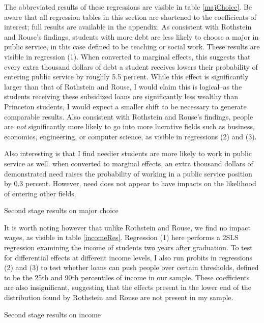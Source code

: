 \documentclass[12pt]{article}
\newcommand{\regs}{../Analysis/Regressions/Output/}
\begin{document}
	The abbreviated results of these regressions are visible in table \ref{majChoice}. Be aware that all regression tables in this section are shortened to the coefficients of interest; full results are available in the appendix. As consistent with Rothstein and Rouse's findings, students with more debt are less likely to choose a major in public service, in this case defined to be teaching or social work. These results are visible in regression (1). When converted to marginal effects, this suggests that every extra thousand dollars of debt a student receives lowers their probability of entering public service by roughly 5.5 percent. While this effect is significantly larger than that of Rothstein and Rouse, I would claim this is logical--as the students receiving these subsidized loans are significantly less wealthy than Princeton students, I would expect a smaller shift to be necessary to generate comparable results. Also consistent with Rothstein and Rouse's findings, people are \emph{not} significantly more likely to go into more lucrative fields such as business, economics, engineering, or computer science, as visible in regressions (2) and (3). 
	
	Also interesting is that I find needier students are more likely to work in public service as well. when converted to marginal effects, an extra thousand dollars of demonstrated need raises the probability of working in a public service position by 0.3 percent. However, need does not appear to have impacts on the likelihood of entering other fields.

	\begin{table}
		\centering
		\caption{Second stage results on major choice}		
		
		\label{majChoice}
	\end{table}
	
	It is worth noting however that unlike Rothstein and Rouse, we find no impact wages, as visible in table \ref{incomeRes}. Regression (1) here performs a 2SLS regression examining the income of students two years after graduation. To test for differential effects at different income levels, I also run probits in regressions (2) and (3) to test whether loans can push people over certain thresholds, defined to be the 25th and 90th percentiles of income in our sample. These coefficients are also insignificant, suggesting that the effects present in the lower end of the distribution found by Rothstein and Rouse are not present in my sample.
	
	\begin{table}
		\centering
		\caption{Second stage results on income}		
		
		\label{incomeRes}
	\end{table}
	
\end{document}
